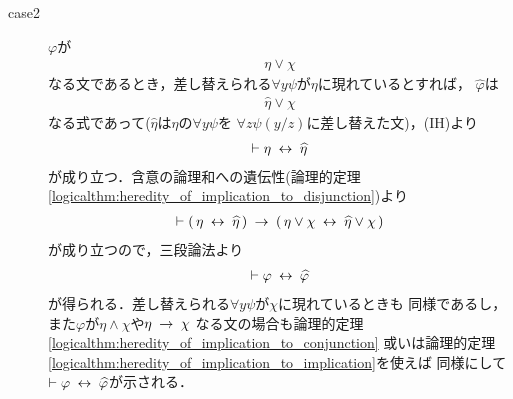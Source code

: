 \begin{sketch}
\begin{description}
\begin{description}
				\item[case2] 
					$\varphi$が
					\begin{align}
						\eta \vee \chi
					\end{align}
					なる文であるとき，差し替えられる$\forall y \psi$が$\eta$に現れているとすれば，
					$\widehat{\varphi}$は
					\begin{align}
						\widehat{\eta} \vee \chi
					\end{align}
					なる式であって($\widehat{\eta}$は$\eta$の$\forall y \psi$を
					$\forall z \psi(y/z)$に差し替えた文)，(IH)より
					\begin{align}
						\vdash \eta \hspace{0.25em}\leftrightarrow\hspace{0.25em} \widehat{\eta}
					\end{align}
					が成り立つ．含意の論理和への遺伝性(論理的定理
					\ref{logicalthm:heredity_of_implication_to_disjunction})より
					\begin{align}
						\vdash (\, \eta \hspace{0.25em}\leftrightarrow\hspace{0.25em} \widehat{\eta}\, ) 
						\hspace{0.25em}\rightarrow\hspace{0.25em} (\, \eta \vee \chi \hspace{0.25em}\leftrightarrow\hspace{0.25em} 
						\widehat{\eta} \vee \chi\, )
					\end{align}
					が成り立つので，三段論法より
					\begin{align}
						\vdash \varphi \hspace{0.25em}\leftrightarrow\hspace{0.25em} \widehat{\varphi}
					\end{align}
					が得られる．差し替えられる$\forall y \psi$が$\chi$に現れているときも
					同様であるし，また$\varphi$が$\eta \wedge \chi$や$\eta \hspace{0.25em}\rightarrow\hspace{0.25em} \chi$
					なる文の場合も論理的定理
					\ref{logicalthm:heredity_of_implication_to_conjunction}
					或いは論理的定理
					\ref{logicalthm:heredity_of_implication_to_implication}を使えば
					同様にして$\vdash \varphi \hspace{0.25em}\leftrightarrow\hspace{0.25em} \widehat{\varphi}$が示される．
					
					

\end{description}
\end{description}
\end{sketch}

